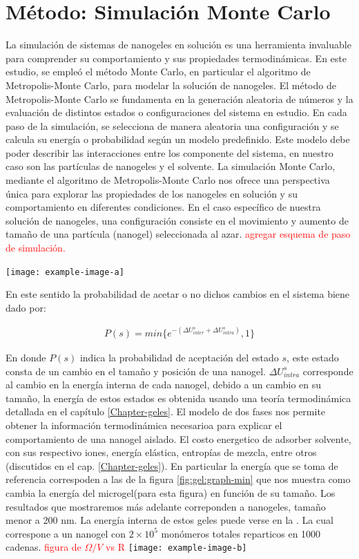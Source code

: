 \section{M\'etodo: Simulaci\'on Monte Carlo}


La simulaci\'on de sistemas de nanogeles en soluci\'on es una herramienta invaluable para comprender su comportamiento y sus propiedades termodin\'amicas. En este estudio, se emple\'o el m\'etodo Monte Carlo, en particular el algoritmo de Metropolis-Monte Carlo, para modelar la soluci\'on de nanogeles.
El m\'etodo de Metropolis-Monte Carlo \addcite se fundamenta en la generaci\'on aleatoria de n\'umeros y la evaluaci\'on de distintos estados o configuraciones del sistema en estudio. En cada paso de la simulaci\'on, se selecciona de manera aleatoria una configuraci\'on y se calcula su energ\'ia o probabilidad seg\'un un modelo predefinido. Este modelo debe poder describir las interacciones entre los componente del sistema, en nuestro caso son las part\'iculas de nanogeles y el solvente.
La simulaci\'on Monte Carlo, mediante el algoritmo de Metropolis-Monte Carlo nos ofrece una perspectiva \'unica para explorar las propiedades de los nanogeles en soluci\'on y su comportamiento en diferentes condiciones. 
En el caso espec\'ifico de nuestra soluci\'on de nanogeles, una configuraci\'on consiste en el movimiento y aumento de tama\~no de una part\'icula (nanogel) seleccionada al azar. 
\textcolor{red}{agregar esquema de paso de simulaci\'on.}

\texttt{[image: example-image-a]} 

En este sentido la probabilidad de acetar o no dichos cambios en el sistema biene dado por:

\begin{align}
	P(s) = min \{e^{-(\Delta U^s_{inter} + \Delta U^s_{intra})},1\}
\end{align}

En donde $P(s)$ indica la probabilidad de aceptaci\'on del estado $s$, este estado consta de un cambio en el tama\~no y posici\'on de una nanogel. $\Delta U^s_{intra}$ corresponde al cambio en la energ\'ia interna de cada nanogel, debido a un cambio en su tama\~no, la energ\'ia de estos estados es obtenida usando una teor\'ia termodin\'amica detallada en el cap\'itulo  \ref{Chapter-geles}. El modelo de dos fases nos permite obtener la informaci\'on termodin\'amica necesarioa para explicar el comportamiento de una nanogel aislado.
El costo energetico de adsorber solvente, con sus respectivo iones, energ\'ia el\'astica, entrop\'ias de mezcla, entre otros (discutidos en el cap. \ref{Chapter-geles}).
En particular la energ\'ia que se toma de referencia correspoden a las de la figura \ref{fig:gel:graph-min} que nos muestra como cambia la energ\'ia del microgel(para esta figura) en funci\'on de su tama\~no.
Los resultados que mostraremos m\'as adelante correponden a nanogeles, tama\~no menor a 200 nm.
La energ\'ia interna de estos geles puede verse en la . La cual correspone a un nanogel con $2\times10^5$ mon\'omeros totales reparticos en 1000 cadenas. \textcolor{red}{figura de $\Omega/V$ vs R}
\texttt{[image: example-image-b]} 

